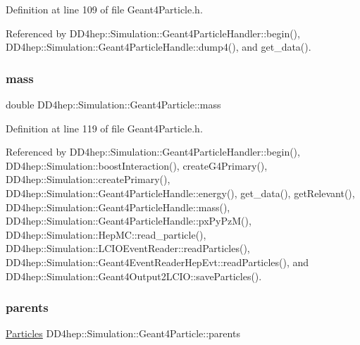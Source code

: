 Definition at line 109 of file Geant4\+Particle.\+h.



Referenced by D\+D4hep\+::\+Simulation\+::\+Geant4\+Particle\+Handler\+::begin(), D\+D4hep\+::\+Simulation\+::\+Geant4\+Particle\+Handle\+::dump4(), and get\+\_\+data().

\hypertarget{class_d_d4hep_1_1_simulation_1_1_geant4_particle_aeb13e47e5c91dcfbfac27f41552b8298}{}\label{class_d_d4hep_1_1_simulation_1_1_geant4_particle_aeb13e47e5c91dcfbfac27f41552b8298} 
\subsubsection{\texorpdfstring{mass}{mass}}
{\footnotesize\ttfamily double D\+D4hep\+::\+Simulation\+::\+Geant4\+Particle\+::mass}



Definition at line 119 of file Geant4\+Particle.\+h.



Referenced by D\+D4hep\+::\+Simulation\+::\+Geant4\+Particle\+Handler\+::begin(), D\+D4hep\+::\+Simulation\+::boost\+Interaction(), create\+G4\+Primary(), D\+D4hep\+::\+Simulation\+::create\+Primary(), D\+D4hep\+::\+Simulation\+::\+Geant4\+Particle\+Handle\+::energy(), get\+\_\+data(), get\+Relevant(), D\+D4hep\+::\+Simulation\+::\+Geant4\+Particle\+Handle\+::mass(), D\+D4hep\+::\+Simulation\+::\+Geant4\+Particle\+Handle\+::px\+Py\+Pz\+M(), D\+D4hep\+::\+Simulation\+::\+Hep\+M\+C\+::read\+\_\+particle(), D\+D4hep\+::\+Simulation\+::\+L\+C\+I\+O\+Event\+Reader\+::read\+Particles(), D\+D4hep\+::\+Simulation\+::\+Geant4\+Event\+Reader\+Hep\+Evt\+::read\+Particles(), and D\+D4hep\+::\+Simulation\+::\+Geant4\+Output2\+L\+C\+I\+O\+::save\+Particles().

\hypertarget{class_d_d4hep_1_1_simulation_1_1_geant4_particle_a78909a136dade0e85770a6e0edb3bdad}{}\label{class_d_d4hep_1_1_simulation_1_1_geant4_particle_a78909a136dade0e85770a6e0edb3bdad} 
\subsubsection{\texorpdfstring{parents}{parents}}
{\footnotesize\ttfamily \hyperlink{class_d_d4hep_1_1_simulation_1_1_geant4_particle_a123ad778eff51ea80ce778d54776c072}{Particles} D\+D4hep\+::\+Simulation\+::\+Geant4\+Particle\+::parents}



